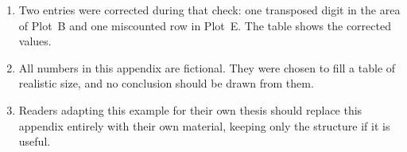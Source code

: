 \begin{enumerate}
\item
Two entries were corrected during that check: one
transposed digit in the area of Plot~B and one miscounted
row in Plot~E. The table shows the corrected values.

\item
All numbers in this appendix are fictional. They were
chosen to fill a table of realistic size, and no
conclusion should be drawn from them.

\item
Readers adapting this example for their own thesis
should replace this appendix entirely with their own
material, keeping only the structure if it is useful.

\end{enumerate}
